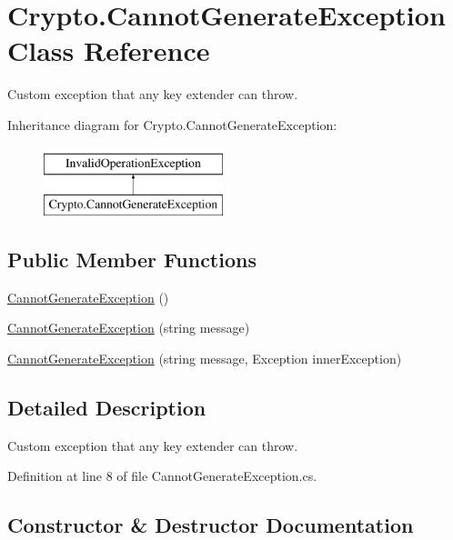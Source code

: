 \hypertarget{class_crypto_1_1_cannot_generate_exception}{}\section{Crypto.\+Cannot\+Generate\+Exception Class Reference}
\label{class_crypto_1_1_cannot_generate_exception}


Custom exception that any key extender can throw.  


Inheritance diagram for Crypto.\+Cannot\+Generate\+Exception\+:\begin{figure}[H]
\begin{center}
\leavevmode
\includegraphics[height=2.000000cm]{class_crypto_1_1_cannot_generate_exception}
\end{center}
\end{figure}
\subsection*{Public Member Functions}
\begin{DoxyCompactItemize}
\item 
\hyperlink{class_crypto_1_1_cannot_generate_exception_a17a4ab8ac6a435318f69bf88ae224598}{Cannot\+Generate\+Exception} ()
\item 
\hyperlink{class_crypto_1_1_cannot_generate_exception_acc186360edfaaa431c4c64ef7562dd56}{Cannot\+Generate\+Exception} (string message)
\item 
\hyperlink{class_crypto_1_1_cannot_generate_exception_a85fc7abc1f61642c128e1d14d2985ecf}{Cannot\+Generate\+Exception} (string message, Exception inner\+Exception)
\end{DoxyCompactItemize}


\subsection{Detailed Description}
Custom exception that any key extender can throw. 



Definition at line 8 of file Cannot\+Generate\+Exception.\+cs.



\subsection{Constructor \& Destructor Documentation}
\hypertarget{class_crypto_1_1_cannot_generate_exception_a17a4ab8ac6a435318f69bf88ae224598}{}
